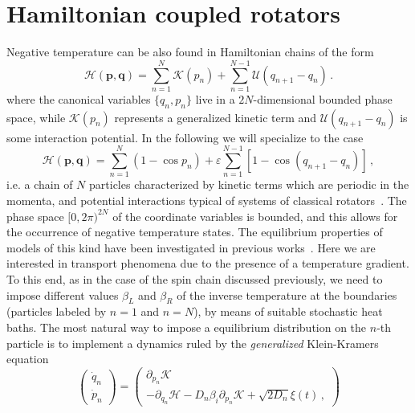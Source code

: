 \documentclass[iop, twocolumns, amssymb,notitlepage]{revtex4-1}
\newcommand{\indice}{n}
\begin{document}
\section{Hamiltonian coupled rotators}
\label{sec:ham}

Negative temperature can be also found in Hamiltonian chains of the form
 \begin{equation}
\label{eq:hamchain}
  \mathcal{H}(\mathbf{p},\mathbf{q})=\sum_{\indice=1}^{N} \mathcal{K}(p_\indice) + \sum_{\indice=1}^{N-1} \mathcal{U}(q_{\indice+1}-q_\indice)\,.
 \end{equation}
 where the canonical variables $\{q_\indice,p_\indice\}$ live in a $2N$-dimensional bounded 
phase space, while $\mathcal{K}(p_\indice)$ represents a generalized kinetic term and 
$\mathcal{U}(q_{\indice+1}-q_\indice)$ is some interaction potential. In the following we 
will specialize to the case 
\begin{equation}
\label{eq:hamchain2}
 \mathcal{H}(\mathbf{p}, \mathbf{q})=\sum_{\indice=1}^{N} (1-\cos p_\indice) + \varepsilon \sum_{\indice=1}^{N-1}[1-\cos (q_{\indice+1}-q_{\indice})]\,,
\end{equation} 
i.e. a chain of $N$ particles characterized by kinetic terms which are 
periodic in the momenta, and potential interactions typical of systems of 
classical rotators~\cite{giardina00, gendelman00}. The phase space  $[0,2\pi)^{2N}$ of the coordinate 
variables is bounded, and this allows for the occurrence of negative temperature 
states. The  equilibrium properties of models of this kind have been 
investigated in previous works~\cite{cerino15, baldovin17, baldovin18}. Here we 
are interested in transport phenomena due to the presence of a temperature 
gradient. To this end, as in the case of the spin chain discussed previously, we 
need to impose different values $\beta_L$ and $\beta_R$ of the inverse 
temperature at the boundaries (particles labeled by $\indice=1$ and $\indice=N$), by means
of suitable stochastic heat baths. The most natural way to impose a equilibrium 
distribution on the $\indice$-th particle is to implement a dynamics ruled by the 
\textit{generalized} Klein-Kramers equation
\begin{equation}
\label{eq:genkk}
 \begin{pmatrix}
  \dot{q}_\indice\\
  \dot{p}_\indice
 \end{pmatrix}
 =
  \begin{pmatrix}
  \partial_{p_\indice} \mathcal{K}\\
  -\partial_{q_\indice} \mathcal{H}-D_\indice\beta_i\partial_{p_\indice} \mathcal{K} +\sqrt{2D_\indice}\xi(t)\,,
 \end{pmatrix}
\end{equation}
\end{document}
